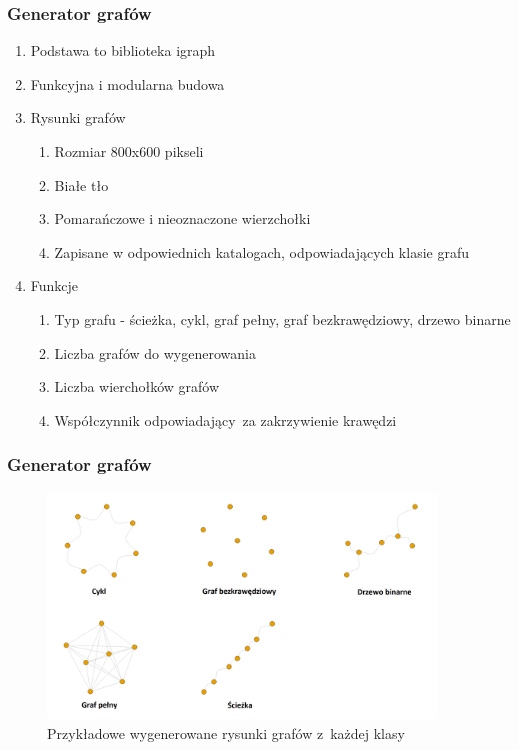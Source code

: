 \begin{frame}
    \frametitle{Generator grafów}

    \begin{enumerate}
        \item Podstawa to biblioteka igraph
        \item Funkcyjna i modularna budowa
        \item Rysunki grafów
            \begin{enumerate}
                \item Rozmiar 800x600 pikseli
                \item Białe tło
                \item Pomarańczowe i nieoznaczone wierzchołki
                \item Zapisane w odpowiednich katalogach, odpowiadających klasie grafu
            \end{enumerate}
        \item Funkcje
            \begin{enumerate}
                \item Typ grafu - ścieżka, cykl, graf pełny, graf bezkrawędziowy, drzewo binarne
                \item Liczba grafów do wygenerowania
                \item Liczba wierchołków grafów
                \item Współczynnik odpowiadający~za zakrzywienie krawędzi
            \end{enumerate}
    \end{enumerate}

\end{frame}

\begin{frame}
    \frametitle{Generator grafów}

    \begin{figure}[ht]
        \centering
        \includegraphics[height=6cm]{../thesis/resources/model/images/gen-graphs-generated.png}
        \caption{Przykładowe wygenerowane rysunki grafów z~każdej klasy}
    \end{figure}

\end{frame}